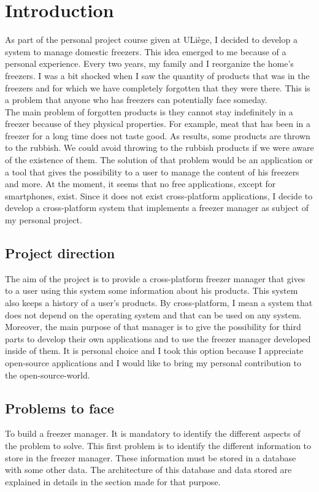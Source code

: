 \section{Introduction}
As part of the personal project course given at ULiège, I decided to develop a system to manage domestic freezers. This idea emerged to me because of a personal experience. Every two years, my family and I reorganize the home's freezers. I was a bit shocked when I saw the quantity of products that was in the freezers and for which we have completely forgotten that they were there. This is a problem that anyone who has freezers can potentially face someday. \\

The main problem of forgotten products is they cannot stay indefinitely in a freezer because of they physical properties. For example, meat that has been in a freezer for a long time does not taste good. As results, some products are thrown to the rubbish. We could avoid throwing to the rubbish products if we were aware of the existence of them. The solution of that problem would be an application or a tool that gives the possibility to a user to manage the content of his freezers and more. At the moment, it seems that no free applications, except for smartphones, exist. Since it does not exist cross-platform applications, I decide to develop a cross-platform system that implements a freezer manager as subject of my personal project.

\subsection{Project direction}
The aim of the project is to provide a cross-platform freezer manager that gives to a user using this system some information about his products. This system also keeps a history of a user's products. By cross-platform, I mean a system that does not depend on the operating system and that can be used on any system. Moreover, the main purpose of that manager is to give the possibility for third parts to develop their own applications and to use the freezer manager developed inside of them. It is personal choice and I took this option because I appreciate open-source applications and I would like to bring my personal contribution to the open-source-world. \\

\subsection{Problems to face}
To build a freezer manager. It is mandatory to identify the different aspects of the problem to solve. This first problem is to identify the different information to store in the freezer manager. These information must be stored in a database with some other data. The architecture of this database and data stored are explained in details in the section made for that purpose.\\

